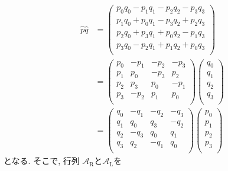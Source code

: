 \begin{align}
   \hat{p} \hat{q}
 &=
   \left(
     \begin{array}{c}
      p_{0} q_{0} - p_{1}q_{1} - p_{2}q_{2} - p_{3}q_{3} \\
      p_{1} q_{0} + p_{0}q_{1} - p_{3}q_{2} + p_{2}q_{3} \\
      p_{2} q_{0} + p_{3}q_{1} + p_{0}q_{2} - p_{1}q_{3} \\
      p_{3} q_{0} - p_{2}q_{1} + p_{1}q_{2} + p_{0}q_{3} \\
     \end{array}
   \right)
 \\
 &=
   \left(
     \begin{array}{cccc}
       p_{0} & -p_{1} & -p_{2} & -p_{3} \\
       p_{1} &  p_{0} & -p_{3} &  p_{2} \\
       p_{2} &  p_{3} &  p_{0} & -p_{1} \\
       p_{3} & -p_{2} &  p_{1} &  p_{0} \\
     \end{array}
   \right)
   \left(
     \begin{array}{c}
      q_{0} \\
      q_{1} \\
      q_{2} \\
      q_{3} \\
     \end{array}
   \right)
 \\
 &=
   \left(
     \begin{array}{cccc}
       q_{0} & -q_{1} & -q_{2} & -q_{3} \\
       q_{1} &  q_{0} &  q_{3} & -q_{2} \\
       q_{2} & -q_{3} &  q_{0} &  q_{1} \\
       q_{3} &  q_{2} & -q_{1} &  q_{0} \\
     \end{array}
   \right)
   \left(
     \begin{array}{c}
      p_{0} \\
      p_{1} \\
      p_{2} \\
      p_{3} \\
     \end{array}
   \right)
\end{align}
となる. そこで, 行列 $\mathcal{A}_{\mathrm{R}}$と$\mathcal{A}_{\mathrm{L}}$を
